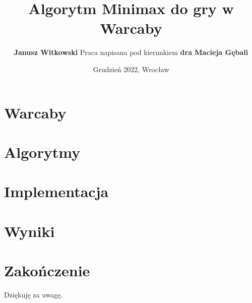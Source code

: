 \documentclass{beamer}
\title{Algorytm Minimax do gry w Warcaby}
\author{
	\textbf{Janusz Witkowski}
	\newline \newline
	Praca napisana pod kierunkiem \textbf{dra Macieja Gębali}
}
\date{Grudzień 2022, Wrocław}
\begin{document}
\begin{frame}[plain]{}
	\titlepage
\end{frame}


\section{Warcaby}

\section{Algorytmy}

\section{Implementacja}






\section{Wyniki}





\section{Zakończenie}




\begin{frame}{}
	\begin{center}
		\large{Dziękuję za uwagę.}
	\end{center}
\end{frame}
\end{document}
